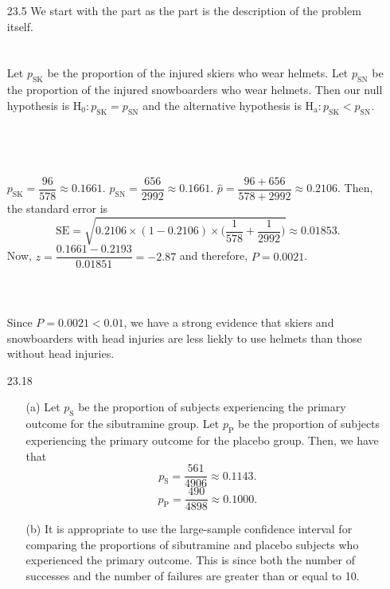 \documentclass[11pt, a4paper]{article}
\newcommand\und[1]{\underline{\smash{#1}}}
\begin{document}
\begin{itemize}
\item[23.5]
We start with the \und{\textbf{PLAN}} part as the \und{\textbf{STATE}}
part is the description of the problem itself.\\\\
\und{\textbf{PLAN}}\\
Let $p_\text{SK}$ be the proportion of the injured skiers who wear helmets.
Let $p_\text{SN}$ be the proportion of the injured snowboarders who wear helmets.
Then our null hypothesis is $\text{H}_0: p_\text{SK} = p_\text{SN}$ and the alternative
hypothesis is $\text{H}_\text{a}: p_\text{SK} < p_\text{SN}$.
\\\\\\
\und{\textbf{SOLVE}}\\\\
$p_\text{SK} = \dfrac{96}{578} \approx 0.1661$.
$p_\text{SN} = \dfrac{656}{2992} \approx 0.1661$.
$\hat{p} = \dfrac{96 + 656}{578 + 2992} \approx 0.2106$.
Then, the standard error is
$$\text{SE} = \sqrt{0.2106 \times (1 - 0.2106) \times \bigg(\frac{1}{578} + \frac{1}{2992}\bigg)} \approx 0.01853.$$
Now, $z = \dfrac{0.1661 - 0.2193}{0.01851} = -2.87$ and therefore, $P = 0.0021$.
\\\\\\
\und{\textbf{CONCLUDE}}\\
Since $P = 0.0021 < 0.01$, we have a strong evidence that skiers and snowboarders with head injuries are less liekly
to use helmets than those without head injuries.

\item[]
\item[]

\item[23.18]
\begin{itemize}
\item[(a)]
Let $p_\text{S}$ be the proportion of subjects experiencing the primary outcome for the sibutramine group.
Let $p_\text{P}$ be the proportion of subjects experiencing the primary outcome for the placebo group.
Then, we have that
$$p_\text{S} = \dfrac{561}{4906} \approx 0.1143.$$
$$p_\text{P} = \dfrac{490}{4898} \approx 0.1000.$$

\item[]

\item[(b)]
It is appropriate to use the large-sample confidence interval
for comparing the proportions of sibutramine and placebo subjects
who experienced the primary outcome. This is since both the number
of successes and the number of failures are greater than or equal
to 10.


\end{itemize}
\end{itemize}
\end{document}
